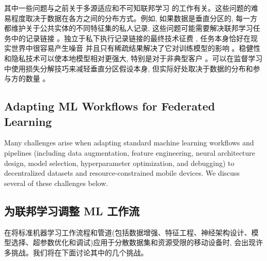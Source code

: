 其中一些问题与之前关于多源适应和不可知联邦学习 \citep{mansour2009domain,mansour2009domainb,hoffman2018algorithms,Mohri2019} 的工作有关。这些问题的难易程度取决于数据在各方之间的分布方式。例如, 如果数据是垂直分区的, 每一方都维护关于公共实体的不同特征集的私人记录, 这些问题可能需要解决联邦学习任务中的记录链接 \cite{christen12}。独立于私下执行记录链接的最终技术征费 \cite{schnell11}, 任务本身恰好在现实世界中很容易产生噪音 \cite{sEP} 并且只有稀疏结果解决了它对训练模型的影响 \cite{ Hardy2017-da}。稳健性和隐私技术可以使本地模型相对更强大, 特别是对于非典型客户 \citep{yu2020salvaging}。可以在监督学习中使用损失分解技巧来减轻垂直分区假设本身, 但实际好处取决于数据的分布和参与方的数量 \cite{pnhcFL}。


\subsection{Adapting ML Workflows for Federated Learning}
\label{sec:workflows}


Many challenges arise when adapting standard machine learning workflows and pipelines (including data augmentation, feature engineering, neural architecture design, model selection, hyperparameter optimization, and debugging) to decentralized datasets and resource-constrained mobile devices. We discuss several of these challenges below.


\subsection*{为联邦学习调整 ML 工作流}

在将标准机器学习工作流程和管道(包括数据增强、特征工程、神经架构设计、模型选择、超参数优化和调试)应用于分散数据集和资源受限的移动设备时, 会出现许多挑战。我们将在下面讨论其中的几个挑战。

